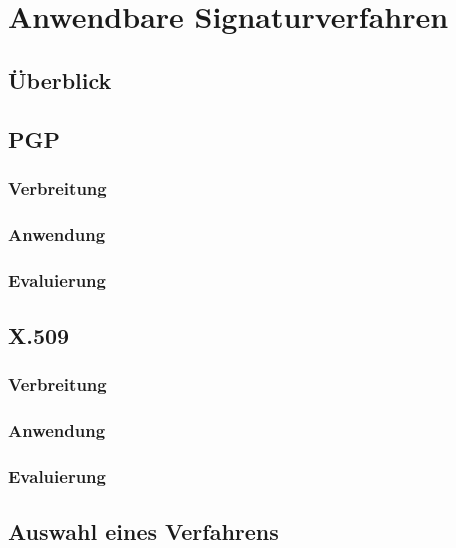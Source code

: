 
\chapter{Anwendbare Signaturverfahren}
\label{chap:Signaturverfahren}

\section{Überblick}

\section{PGP}
%
\label{sec:Signaturverfahren:PGP}%

\subsection{Verbreitung}

\subsection{Anwendung}

\subsection{Evaluierung}

\section{X.509}
%
\label{sec:Signaturverfahren:x509}%

\subsection{Verbreitung}

\subsection{Anwendung}

\subsection{Evaluierung}

\section{Auswahl eines Verfahrens}

